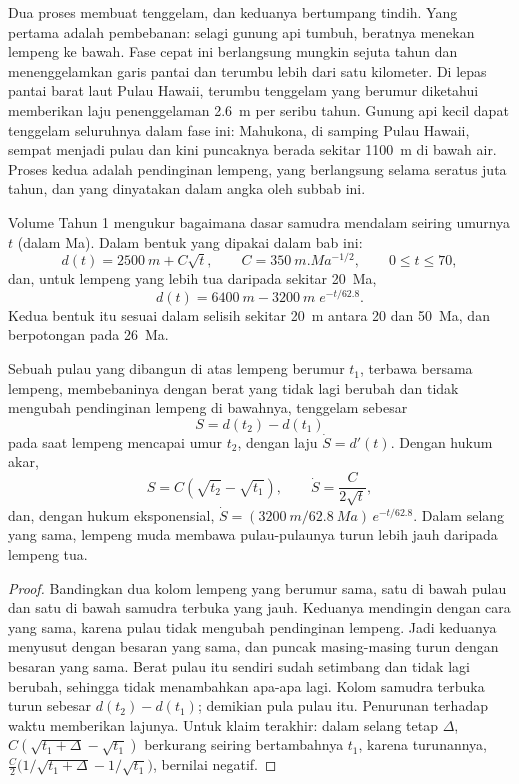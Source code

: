 Dua proses membuat  tenggelam, dan keduanya bertumpang tindih. Yang pertama adalah pembebanan: selagi gunung api
tumbuh, beratnya menekan lempeng ke bawah. Fase cepat ini berlangsung mungkin sejuta tahun dan
menenggelamkan garis pantai dan terumbu lebih dari satu kilometer. Di lepas pantai barat laut Pulau
Hawaii, terumbu tenggelam yang berumur diketahui memberikan laju penenggelaman \qty{2.6}{m} per seribu tahun. Gunung api
kecil dapat tenggelam seluruhnya dalam fase ini: Mahukona, di samping Pulau Hawaii, sempat menjadi
pulau dan kini puncaknya berada sekitar \qty{1100}{m} di bawah air. Proses kedua adalah
pendinginan lempeng, yang berlangsung selama seratus juta tahun, dan yang dinyatakan dalam angka oleh subbab ini.

Volume Tahun 1 mengukur bagaimana dasar samudra mendalam seiring umurnya $t$ (dalam \unit{Ma}). Dalam
bentuk yang dipakai dalam bab ini:
\[
d(t) = \qty{2500}{m} + C\sqrt{t}, \qquad C = \qty{350}{m.Ma^{-1/2}}, \qquad 0 \le t \le 70,
\]
dan, untuk lempeng yang lebih tua daripada sekitar \qty{20}{Ma},
\[
d(t) = \qty{6400}{m} - \qty{3200}{m}\; e^{-t/62.8}.
\]
Kedua bentuk itu sesuai dalam selisih sekitar \qty{20}{m} antara 20 dan \qty{50}{Ma}, dan berpotongan pada
\qty{26}{Ma}.

\begin{proposition}\label{prop:b2:oceanic-islands:sinking}
Sebuah pulau yang dibangun di atas lempeng berumur $t_1$, terbawa bersama lempeng, membebaninya dengan berat yang
tidak lagi berubah dan tidak mengubah pendinginan lempeng di bawahnya, tenggelam sebesar
\[
S = d(t_2) - d(t_1)
\]
pada saat lempeng mencapai umur $t_2$, dengan laju $\dot S = d'(t)$. Dengan hukum akar,
\[
S = C\left(\sqrt{t_2} - \sqrt{t_1}\right), \qquad \dot S = \frac{C}{2\sqrt t},
\]
dan, dengan hukum eksponensial, $\dot S = (\qty{3200}{m}/\qty{62.8}{Ma})\,e^{-t/62.8}$. Dalam
selang yang sama, lempeng muda membawa pulau-pulaunya turun lebih jauh daripada lempeng tua.
\end{proposition}

\begin{proof}
Bandingkan dua kolom lempeng yang berumur sama, satu di bawah pulau dan satu di bawah samudra
terbuka yang jauh. Keduanya mendingin dengan cara yang sama, karena pulau tidak mengubah pendinginan lempeng. Jadi keduanya menyusut dengan besaran yang sama, dan puncak masing-masing turun dengan besaran
yang sama. Berat pulau itu sendiri sudah setimbang dan tidak lagi berubah, sehingga tidak menambahkan apa-apa
lagi. Kolom samudra terbuka turun sebesar $d(t_2) - d(t_1)$; demikian pula pulau itu. Penurunan terhadap waktu
memberikan lajunya. Untuk klaim terakhir: dalam selang tetap $\Delta$, $C(\sqrt{t_1 + \Delta} -
\sqrt{t_1})$ berkurang seiring bertambahnya $t_1$, karena turunannya, $\frac C2\bigl(1/\sqrt{t_1 + \Delta}
- 1/\sqrt{t_1}\bigr)$, bernilai negatif.
\end{proof}

